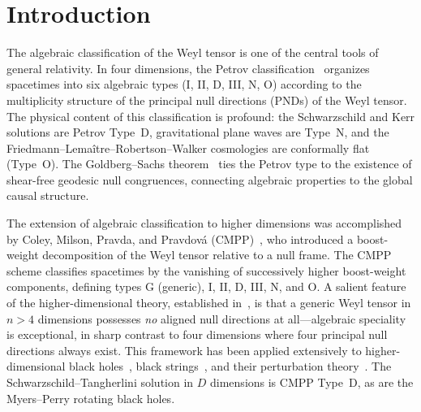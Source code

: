 \documentclass[12pt]{article}
\theoremstyle{definition}
\theoremstyle{remark}
\begin{document}
\section{Introduction}

The algebraic classification of the Weyl tensor is one of the central tools of general relativity.  In four dimensions, the Petrov classification~\cite{Petrov1954,Penrose1960} organizes spacetimes into six algebraic types (I, II, D, III, N, O) according to the multiplicity structure of the principal null directions (PNDs) of the Weyl tensor.  The physical content of this classification is profound: the Schwarzschild and Kerr solutions are Petrov Type~D, gravitational plane waves are Type~N, and the Friedmann--Lema\^itre--Robertson--Walker cosmologies are conformally flat (Type~O).  The Goldberg--Sachs theorem~\cite{GoldbergSachs1962} ties the Petrov type to the existence of shear-free geodesic null congruences, connecting algebraic properties to the global causal structure.

The extension of algebraic classification to higher dimensions was accomplished by Coley, Milson, Pravda, and Pravdov\'a (CMPP)~\cite{CMPP2004,Milson2004}, who introduced a boost-weight decomposition of the Weyl tensor relative to a null frame.  The CMPP scheme classifies spacetimes by the vanishing of successively higher boost-weight components, defining types G (generic), I, II, D, III, N, and O.  A salient feature of the higher-dimensional theory, established in~\cite{Milson2004}, is that a generic Weyl tensor in $n>4$ dimensions possesses \emph{no} aligned null directions at all---algebraic speciality is exceptional, in sharp contrast to four dimensions where four principal null directions always exist.  This framework has been applied extensively to higher-dimensional black holes~\cite{MyersPerry1986,EmparanReall2008}, black strings~\cite{GregoryLaflamme1993}, and their perturbation theory~\cite{Ortaggio2013,Durkee2010}.  The Schwarzschild--Tangherlini solution in $D$ dimensions is CMPP Type~D, as are the Myers--Perry rotating black holes.
\end{document}
